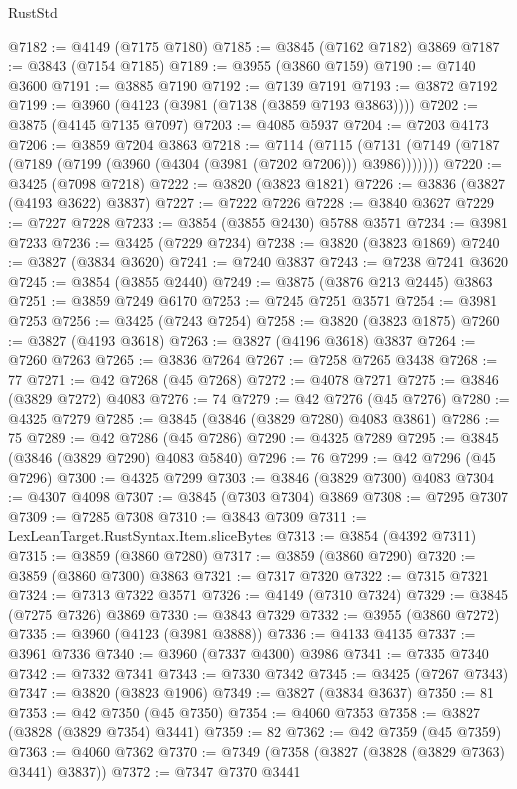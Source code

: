 \begin{lexlean}{RustStd}
\begin{coremodule}
@7182 := @4149 (@7175 @7180)
@7185 := @3845 (@7162 @7182) @3869
@7187 := @3843 (@7154 @7185)
@7189 := @3955 (@3860 @7159)
@7190 := @7140 @3600
@7191 := @3885 @7190
@7192 := @7139 @7191
@7193 := @3872 @7192
@7199 := @3960 (@4123 (@3981 (@7138 (@3859 @7193 @3863))))
@7202 := @3875 (@4145 @7135 @7097)
@7203 := @4085 @5937
@7204 := @7203 @4173
@7206 := @3859 @7204 @3863
@7218 := @7114
    (@7115 (@7131 (@7149 (@7187 (@7189 (@7199 (@3960 (@4304 (@3981 (@7202 @7206))) @3986)))))))
@7220 := @3425 (@7098 @7218)
@7222 := @3820 (@3823 @1821)
@7226 := @3836 (@3827 (@4193 @3622) @3837)
@7227 := @7222 @7226
@7228 := @3840 @3627
@7229 := @7227 @7228
@7233 := @3854 (@3855 @2430) @5788 @3571
@7234 := @3981 @7233
@7236 := @3425 (@7229 @7234)
@7238 := @3820 (@3823 @1869)
@7240 := @3827 (@3834 @3620)
@7241 := @7240 @3837
@7243 := @7238 @7241 @3620
@7245 := @3854 (@3855 @2440)
@7249 := @3875 (@3876 @213 @2445) @3863
@7251 := @3859 @7249 @6170
@7253 := @7245 @7251 @3571
@7254 := @3981 @7253
@7256 := @3425 (@7243 @7254)
@7258 := @3820 (@3823 @1875)
@7260 := @3827 (@4193 @3618)
@7263 := @3827 (@4196 @3618) @3837
@7264 := @7260 @7263
@7265 := @3836 @7264
@7267 := @7258 @7265 @3438
@7268 := 77
@7271 := @42 @7268 (@45 @7268)
@7272 := @4078 @7271
@7275 := @3846 (@3829 @7272) @4083
@7276 := 74
@7279 := @42 @7276 (@45 @7276)
@7280 := @4325 @7279
@7285 := @3845 (@3846 (@3829 @7280) @4083 @3861)
@7286 := 75
@7289 := @42 @7286 (@45 @7286)
@7290 := @4325 @7289
@7295 := @3845 (@3846 (@3829 @7290) @4083 @5840)
@7296 := 76
@7299 := @42 @7296 (@45 @7296)
@7300 := @4325 @7299
@7303 := @3846 (@3829 @7300) @4083
@7304 := @4307 @4098
@7307 := @3845 (@7303 @7304) @3869
@7308 := @7295 @7307
@7309 := @7285 @7308
@7310 := @3843 @7309
@7311 := LexLeanTarget.RustSyntax.Item.sliceBytes
@7313 := @3854 (@4392 @7311)
@7315 := @3859 (@3860 @7280)
@7317 := @3859 (@3860 @7290)
@7320 := @3859 (@3860 @7300) @3863
@7321 := @7317 @7320
@7322 := @7315 @7321
@7324 := @7313 @7322 @3571
@7326 := @4149 (@7310 @7324)
@7329 := @3845 (@7275 @7326) @3869
@7330 := @3843 @7329
@7332 := @3955 (@3860 @7272)
@7335 := @3960 (@4123 (@3981 @3888))
@7336 := @4133 @4135
@7337 := @3961 @7336
@7340 := @3960 (@7337 @4300) @3986
@7341 := @7335 @7340
@7342 := @7332 @7341
@7343 := @7330 @7342
@7345 := @3425 (@7267 @7343)
@7347 := @3820 (@3823 @1906)
@7349 := @3827 (@3834 @3637)
@7350 := 81
@7353 := @42 @7350 (@45 @7350)
@7354 := @4060 @7353
@7358 := @3827 (@3828 (@3829 @7354) @3441)
@7359 := 82
@7362 := @42 @7359 (@45 @7359)
@7363 := @4060 @7362
@7370 := @7349 (@7358 (@3827 (@3828 (@3829 @7363) @3441) @3837))
@7372 := @7347 @7370 @3441

\end{coremodule}
\end{lexlean}
